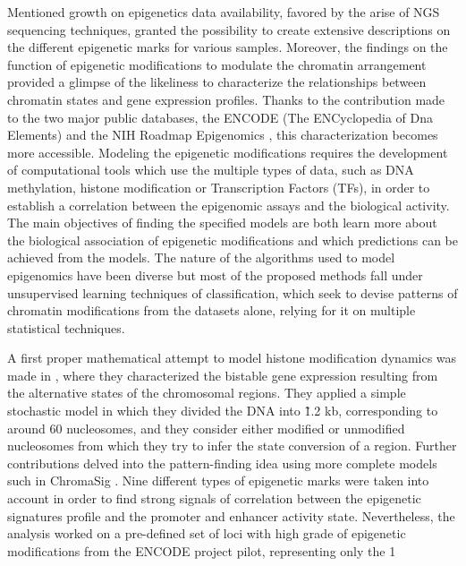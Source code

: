 

Mentioned growth on epigenetics data availability, favored by the arise of NGS sequencing techniques, granted the possibility to create extensive descriptions on the different epigenetic marks for various samples. Moreover, the findings on the function of epigenetic modifications to modulate the chromatin arrangement provided a glimpse of the likeliness to characterize the relationships between chromatin states and gene expression profiles. Thanks to the contribution made to the two major public databases, the ENCODE (The ENCyclopedia of Dna Elements) \cite{Feingold2004} and the NIH Roadmap Epigenomics \cite{Bernstein2010}, this characterization becomes more accessible. Modeling the epigenetic modifications requires the development of computational tools which use the multiple types of data, such as DNA methylation, histone modification or Transcription Factors (TFs), in order to establish a correlation between the epigenomic assays and the biological activity. The main objectives of finding the specified models are both learn more about the biological association of epigenetic modifications and which predictions can be achieved from the models. The nature of the algorithms used to model epigenomics have been diverse but most of the proposed methods fall under unsupervised learning techniques of classification, which seek to devise patterns of chromatin modifications from the datasets alone, relying for it on multiple statistical techniques.

\medskip

A first proper mathematical attempt to model histone modification dynamics was made in \cite{Dodd2007}, where they characterized the bistable gene expression resulting from the alternative states of the chromosomal regions. They applied a simple stochastic model in which they divided the DNA into \~1.2 kb, corresponding to around 60 nucleosomes, and they consider either modified or unmodified nucleosomes from which they try to infer the state conversion of a region. Further contributions delved into the pattern-finding idea using more complete models such in ChromaSig \cite{Hon2008}. Nine different types of epigenetic marks were taken into account in order to find strong signals of correlation between the epigenetic signatures profile and the promoter and enhancer activity state. Nevertheless, the analysis worked on a pre-defined set of loci with high grade of epigenetic modifications from the ENCODE project pilot, representing only the 1%

